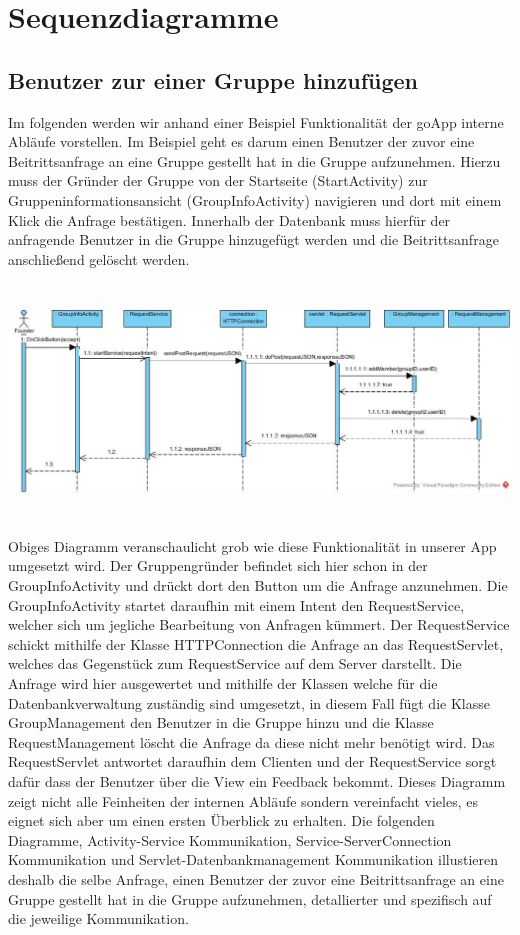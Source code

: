 \section{Sequenzdiagramme}

\subsection{Benutzer zur einer Gruppe hinzufügen}
Im folgenden werden wir anhand einer Beispiel Funktionalität der goApp interne Abläufe vorstellen.
Im Beispiel geht es darum einen Benutzer der zuvor eine Beitrittsanfrage an eine Gruppe gestellt hat in die Gruppe aufzunehmen.
Hierzu muss der Gründer der Gruppe von der Startseite (StartActivity) zur Gruppeninformationsansicht (GroupInfoActivity) navigieren und dort mit einem Klick die Anfrage bestätigen.
Innerhalb der Datenbank muss hierfür der anfragende Benutzer in die Gruppe hinzugefügt werden und die Beitrittsanfrage anschließend gelöscht werden.
\ \\
\ \\
\ \\
\includegraphics[width=1.1\textwidth]{addMemberSequenceDiagram.jpg}
\ \\
\ \\
Obiges Diagramm veranschaulicht grob wie diese Funktionalität in unserer App umgesetzt wird.
Der Gruppengründer befindet sich hier schon in der GroupInfoActivity und drückt dort den Button um die Anfrage anzunehmen.
Die GroupInfoActivity startet daraufhin mit einem Intent den RequestService, welcher sich um jegliche Bearbeitung von Anfragen kümmert.
Der RequestService schickt mithilfe der Klasse HTTPConnection die Anfrage an das RequestServlet, welches das Gegenstück zum RequestService auf dem Server darstellt.
Die Anfrage wird hier ausgewertet und mithilfe der Klassen welche für die Datenbankverwaltung zuständig sind umgesetzt, in diesem Fall fügt die Klasse GroupManagement den Benutzer in die Gruppe hinzu und die Klasse RequestManagement löscht die Anfrage da diese nicht mehr benötigt wird.
Das RequestServlet antwortet daraufhin dem Clienten und der RequestService sorgt dafür dass der Benutzer über die View ein Feedback bekommt. \newline
Dieses Diagramm zeigt nicht alle Feinheiten der internen Abläufe sondern vereinfacht vieles, es eignet sich aber um einen ersten Überblick zu erhalten.
Die folgenden Diagramme, Activity-Service Kommunikation, Service-ServerConnection Kommunikation und Servlet-Datenbankmanagement Kommunikation illustieren deshalb die selbe Anfrage, einen Benutzer der zuvor eine Beitrittsanfrage an eine Gruppe gestellt hat in die Gruppe aufzunehmen, detallierter und spezifisch auf die jeweilige Kommunikation.

